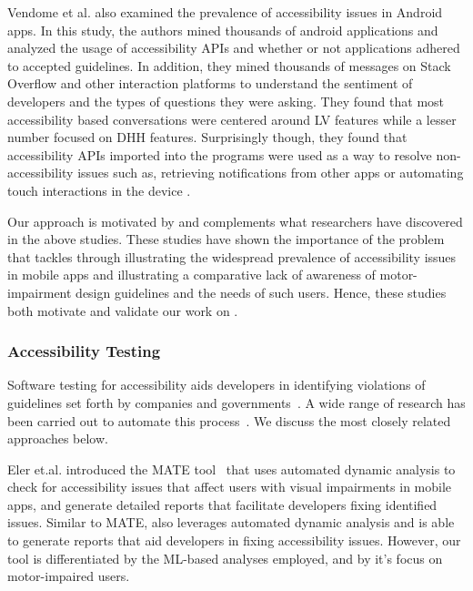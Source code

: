 Vendome et al. \cite{Vendome19} also examined the prevalence of accessibility issues in Android apps. In this study, the authors mined thousands of android applications and analyzed the usage of accessibility APIs and whether or not applications adhered to accepted guidelines. In addition, they mined thousands of messages on Stack Overflow and other interaction platforms to understand the sentiment of developers and the types of questions they were asking. They found that most accessibility based conversations were centered around LV features while a lesser number focused on DHH features. Surprisingly though, they found that accessibility APIs imported into the programs were used as a way to resolve non-accessibility issues such as, retrieving notifications from other apps or automating touch interactions in the device \cite{Vendome19}. 

Our approach is motivated by and complements what researchers have discovered in the above studies. These studies have shown the importance of the problem that \MotorEase tackles through illustrating the widespread prevalence of accessibility issues in mobile apps and illustrating a comparative lack of awareness of motor-impairment design guidelines and the needs of such users. Hence, these studies both motivate and validate our work on \MotorEase.

\vspace{-1em}
\subsubsection{Accessibility Testing}

Software testing for accessibility aids developers in identifying violations of guidelines set forth by companies and governments~\cite{Norman13, GoogleAccess, AppleAccess, Park14}. A wide range of research has been carried out to automate this process~\cite{Ramachandra18,Brajnik15,Salehnamadi21,axeray,Norman13,Eler18,Salehnamadi:ASE'22}. We discuss the most closely related approaches below.

Eler et.al. introduced the MATE tool~\cite{Eler18} that uses automated dynamic analysis to check for accessibility issues that affect users with visual impairments in mobile apps, and generate detailed reports that facilitate developers fixing identified issues. Similar to MATE, \MotorEase also leverages automated dynamic analysis and is able to generate reports that aid developers in fixing accessibility issues. However, our tool is differentiated by the ML-based analyses employed, and by it's focus on motor-impaired users.

